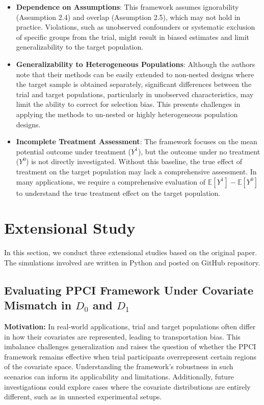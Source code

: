 \documentclass[12pt, oneside]{amsart}
\theoremstyle{definition}
\theoremstyle{remark}
\numberwithin{equation}{section}
\begin{document}
\begin{itemize}
    \item \textbf{Dependence on Assumptions}: This framework assumes ignorability (Assumption 2.4) and overlap (Assumption 2.5), which may not hold in practice. Violations, such as unobserved confounders or systematic exclusion of specific groups from the trial, might result in biased estimates and limit generalizability to the target population.
    
    \item \textbf{Generalizability to Heterogeneous Populations}: Although the authors note that their methods can be easily extended to non-nested designs where the target sample is obtained separately, significant differences between the trial and target populations, particularly in unobserved characteristics, may limit the ability to correct for selection bias. This presents challenges in applying the methods to un-nested or highly heterogeneous population designs. 
    
    \item \textbf{Incomplete Treatment Assessment}: The framework focuses on the mean potential outcome under treatment ($Y^1$), but the outcome under no treatment ($Y^0$) is not directly investigated. Without this baseline, the true effect of treatment on the target population may lack a comprehensive assessment. In many applications, we require a comprehensive evaluation of $\mathbb{E}[Y^1] - \mathbb{E}[Y^0]$ to understand the true treatment effect on the target population.
\end{itemize}

\section{Extensional Study}
In this section, we conduct three extensional studies based on the original paper. The simulations involved are written in Python and posted on GitHub repository.

\subsection{Evaluating PPCI Framework Under Covariate Mismatch in $D_0$ and $D_1$}

\textbf{Motivation:} In real-world applications, trial and target populations often differ in how their covariates are represented, leading to transportation bias. This imbalance challenges generalization and raises the question of whether the PPCI framework remains effective when trial participants overrepresent certain regions of the covariate space. Understanding the framework's robustness in such scenarios can inform its applicability and limitations. Additionally, future investigations could explore cases where the covariate distributions are entirely different, such as in unnested experimental setups.
\end{document}
